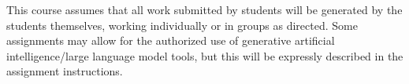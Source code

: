 This course assumes that all work submitted by students will be generated by the
students themselves, working individually or in groups as directed. Some
assignments may allow for the authorized use of generative artificial
intelligence/large language model tools, but this will be expressly described in
the assignment instructions.
